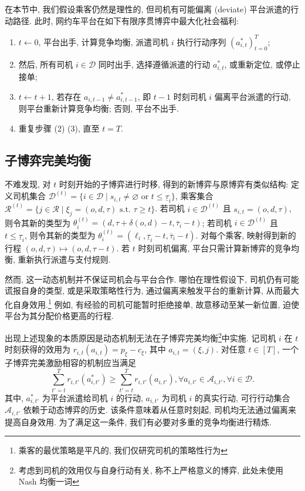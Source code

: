 \documentclass[10pt,twocolumn]{article}
\begin{document}
在本节中, 我们假设乘客仍然是理性的, 但司机有可能偏离 (deviate) 平台派遣的行动路径. 此时, 网约车平台在如下有限序贯博弈中最大化社会福利:

\begin{enumerate}[label=(\arabic*)]
  \item $t\gets 0$, 平台出手, 计算竞争均衡, 派遣司机 $i$ 执行行动序列 $(a^*_{i,t})_{t=0}^T$;
  \item 然后, 所有司机 $i\in \mathcal{D}$ 同时出手, 选择遵循派遣的行动 $a^*_{i,t}$, 或重新定位, 或停止接单;
  \item $t\gets t+1$, 若存在 $a_{i,t-1} \ne a^*_{i,t-1}$, 即 $t-1$ 时刻司机 $i$ 偏离平台派遣的行动, 则平台重新计算竞争均衡; 否则, 平台不出手.
  \item 重复步骤 (2) (3), 直至 $t=T$.
\end{enumerate}

\subsection{子博弈完美均衡}

不难发现, 对 $t$ 时刻开始的子博弈进行时移, 得到的新博弈与原博弈有类似结构: 定义司机集合 $\mathcal{D}^{(t)}=\{i\in\mathcal{D} \mid s_{i,t} \ne \varnothing \text{ or } t \le \underline{\tau}_i\}$, 乘客集合 $\mathcal{R}^{(t)} = \{j\in\mathcal{R} \mid \xi_j = (o,d,\tau) \text { s.t. } \tau\ge t\}$. 若司机 $i\in \mathcal{D}^{(t)}$ 且 $s_{i,t} = (o, d, \tau)$, 则令其新的类型为 $\theta_i^{(t)} = (d, \tau + \delta(o,d) - t, \overline{\tau}_i - t)$; 若司机 $i\in \mathcal{D}^{(t)}$ 且 $t \le \underline{\tau}_i$, 则令其新的类型为 $\theta_i^{(t)} = (\ell_i, \underline{\tau}_i - t, \overline{\tau}_i - t)$. 对每个乘客, 映射得到新的行程 $(o, d, \tau) \mapsto (o, d, \tau - t)$. 若 $t$ 时刻司机偏离, 平台只需计算新博弈的竞争均衡, 重新执行派遣与支付规则.

然而, 这一动态机制并不保证司机会与平台合作. 哪怕在理性假设下, 司机仍有可能谎报自身的类型, 或是采取策略性行为, 通过偏离来触发平台的重新计算, 从而最大化自身效用.\footnote{乘客的最优策略是平凡的, 我们仅研究司机的策略性行为} 例如, 有经验的司机可能暂时拒绝接单, 故意移动至某一新位置, 迫使平台为其分配价格更高的行程.

出现上述现象的本质原因是动态机制无法在子博弈完美均衡\footnote{考虑到司机的效用仅与自身行动有关, 称不上严格意义的博弈, 此处未使用 Nash 均衡一词}中实施. 记司机 $i$ 在 $t$ 时刻获得的效用为 $r_{i,t}(a_{i,t}) = p_\xi - c_\xi$, 其中 $a_{i,t} = (\xi, j)$. 对任意 $t\in [T]$, 一个子博弈完美激励相容的机制应当满足
$$
  \sum_{t'=t}^T r_{i,t'}(a^*_{i,t'}) \ge \sum_{t'=t}^T r_{i,t'}(a_{i,t'}), \forall a_{i,t'}\in \mathcal{A}_{i,t'}, \forall i\in \mathcal{D}.
$$
其中, $a^*_{i,t'}$ 为平台派遣给司机 $i$ 的行动, $a_{i,t'}$ 为司机 $i$ 的真实行动, 可行行动集合 $\mathcal{A}_{i,t'}$ 依赖于动态博弈的历史. 该条件意味着从任意时刻起, 司机均无法通过偏离来提高自身效用. 为了满足这一条件, 我们有必要对多重的竞争均衡进行精炼.
\end{document}
